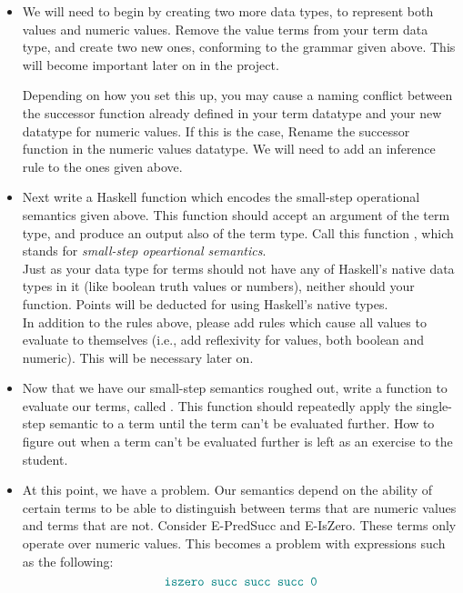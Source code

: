 \documentclass{exam}
\let\OldTexttt\texttt
\renewcommand{\texttt}[1]{\OldTexttt{\color{teal}{#1}}}
\begin{document}
\begin{itemize}
\item We will need to begin by creating two more data types, to represent both values and numeric values.  Remove the value terms from your term data type, and create two new ones, conforming to the grammar given above.  This will become important later on in the project.  

Depending on how you set this up, you may cause a naming conflict between the successor function already defined in your term datatype and your new datatype for numeric values.  If this is the case, Rename the successor function in the numeric values datatype.  We will need to add an inference rule to the ones given above.  

\item Next write a Haskell function which encodes the small-step operational semantics given above.  This function should accept an argument of the term type, and produce an output also of the term type. Call this function \texttt{ssos}, which stands for \emph{small-step opeartional semantics}. \\

Just as your data type for terms should not have any of Haskell's native data types in it (like boolean truth values or numbers), neither should your function.  Points will be deducted for using Haskell's native types.  \\

In addition to the rules above, please add rules which cause all values to evaluate to themselves (i.e., add reflexivity for values, both boolean and numeric).  This will be necessary later on.  

\item Now that we have our small-step semantics roughed out, write a function to evaluate our terms, called \texttt{eval}.  This function should repeatedly apply the single-step semantic to a term until the term can't be evaluated further.  How to figure out when a term can't be evaluated further is left as an exercise to the student.  

\item At this point, we have a problem.  Our semantics depend on the ability of certain terms to be able to distinguish between terms that are numeric values and terms that are not.  Consider E-PredSucc and E-IsZero.  These terms only operate over numeric values.  This becomes a problem with expressions such as the following:
\begin{equation}
\texttt{iszero succ succ succ 0}
\end{equation}


\end{itemize}
\end{document}

